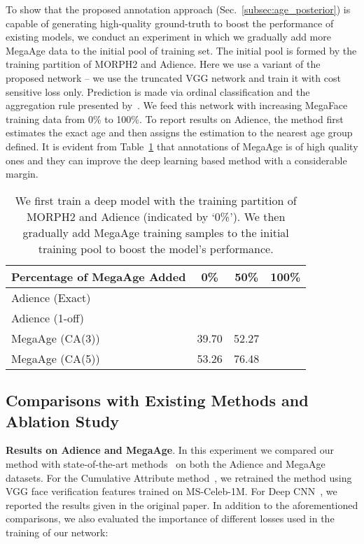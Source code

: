 \documentclass{bmvc2k}
\begin{document}
To show that the proposed annotation approach (Sec.~\ref{subsec:age_posterior}) is capable of generating high-quality ground-truth to boost the performance of existing models, we conduct an experiment in which we gradually add more MegaAge data to the initial pool of training set. The initial pool is formed by the training partition of MORPH2 and Adience.
Here we use a variant of the proposed network -- we use the truncated VGG network and train it with cost sensitive loss only. Prediction is made via ordinal classification and the aggregation rule presented by~\cite{chang2011ordinal}. We feed this network with increasing MegaFace training data from 0\% to 100\%. To report results on Adience, the method first estimates the exact age and then assigns the estimation to the nearest age group defined.
It is evident from Table~\ref{tab:megaage} that annotations of MegaAge is of high quality ones and they can improve the deep learning based method with a considerable margin.

\begin{table}[t]
	\small
	\begin{center}
		\caption{We first train a deep model with the training partition of MORPH2 and Adience (indicated by `0\%'). We then gradually add MegaAge training samples to the initial training pool to boost the model's performance.}
\begin{tabular}{l|ccc}
		\hline

			Percentage of MegaAge Added &  0\% & 50\%  & 100\%  \\
			\hline \hline
			Adience (Exact) &  &  &  \\ 
			Adience (1-off) &  &  &   \\ \hline
			MegaAge (CA(3)) & 39.70 & 52.27 &   \\ 
			MegaAge (CA(5)) & 53.26 & 76.48 &  \\ \hline
		\end{tabular}
		\label{tab:megaage}
	\end{center}
\end{table}

  
\subsection{Comparisons with Existing Methods and Ablation Study}


\noindent
\textbf{Results on Adience and MegaAge}.
In this experiment we compared our method with state-of-the-art methods~\cite{chen2013cumulative,eidinger2014age,levi2015age} on both the Adience and MegaAge datasets. For the Cumulative Attribute method~\cite{chen2013cumulative}, we retrained the method using VGG face verification features trained on MS-Celeb-1M. For Deep CNN~\cite{levi2015age}, we reported the results given in the original paper.
In addition to the aforementioned comparisons, we also evaluated the importance of different losses used in the training of our network:
\end{document}
